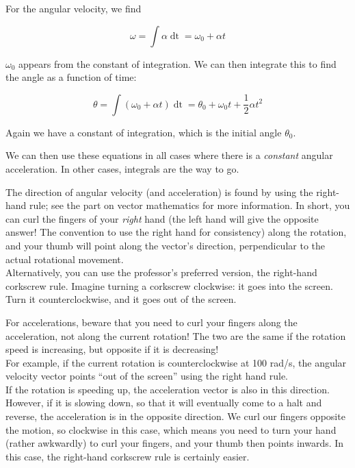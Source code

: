 For the angular velocity, we find

\begin{equation}
\omega = \int \alpha \mathop{dt} = \omega_0 + \alpha t
\end{equation}

$\omega_0$ appears from the constant of integration. We can then integrate this to find the angle as a function of time:

\begin{equation}
\theta = \int (\omega_0 + \alpha t) \mathop{dt} = \theta_0 + \omega_0 t + \frac{1}{2} \alpha t^2
\end{equation}

Again we have a constant of integration, which is the initial angle $\theta_0$.

We can then use these equations in all cases where there is a \emph{constant} angular acceleration. In other cases, integrals are the way to go.

The direction of angular velocity (and acceleration) is found by using the right-hand rule; see the part on vector mathematics for more information. In short, you can curl the fingers of your \emph{right} hand (the left hand will give the opposite answer! The convention to use the right hand for consistency) along the rotation, and your thumb will point along the vector's direction, perpendicular to the actual rotational movement.\\
Alternatively, you can use the professor's preferred version, the right-hand corkscrew rule. Imagine turning a corkscrew clockwise: it goes into the screen. Turn it counterclockwise, and it goes out of the screen.

For accelerations, beware that you need to curl your fingers along the acceleration, not along the current rotation! The two are the same if the rotation speed is increasing, but opposite if it is decreasing!\\
For example, if the current rotation is counterclockwise at 100 rad/s, the angular velocity vector points ``out of the screen'' using the right hand rule.\\
If the rotation is speeding up, the acceleration vector is also in this direction.\\
However, if it is slowing down, so that it will eventually come to a halt and reverse, the acceleration is in the opposite direction. We curl our fingers opposite the motion, so clockwise in this case, which means you need to turn your hand (rather awkwardly) to curl your fingers, and your thumb then points inwards. In this case, the right-hand corkscrew rule is certainly easier.

